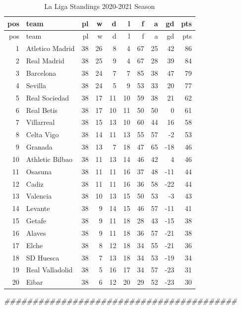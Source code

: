 \documentclass[]{tufte-handout}
\newenvironment{Shaded}{}{}
\newcommand{\DocumentationTok}[1]{\textcolor[rgb]{0.73,0.13,0.13}{\textit{#1}}}
\begin{document}
\begin{longtable}[]{@{}rlrrrrrrrr@{}}
\caption{La Liga Standings 2020-2021 Season}\tabularnewline
\toprule
pos & team & pl & w & d & l & f & a & gd & pts \\
\midrule
\endfirsthead
\toprule
pos & team & pl & w & d & l & f & a & gd & pts \\
\midrule
\endhead
1 & Atletico Madrid & 38 & 26 & 8 & 4 & 67 & 25 & 42 & 86 \\
2 & Real Madrid & 38 & 25 & 9 & 4 & 67 & 28 & 39 & 84 \\
3 & Barcelona & 38 & 24 & 7 & 7 & 85 & 38 & 47 & 79 \\
4 & Sevilla & 38 & 24 & 5 & 9 & 53 & 33 & 20 & 77 \\
5 & Real Sociedad & 38 & 17 & 11 & 10 & 59 & 38 & 21 & 62 \\
6 & Real Betis & 38 & 17 & 10 & 11 & 50 & 50 & 0 & 61 \\
7 & Villarreal & 38 & 15 & 13 & 10 & 60 & 44 & 16 & 58 \\
8 & Celta Vigo & 38 & 14 & 11 & 13 & 55 & 57 & -2 & 53 \\
9 & Granada & 38 & 13 & 7 & 18 & 47 & 65 & -18 & 46 \\
10 & Athletic Bilbao & 38 & 11 & 13 & 14 & 46 & 42 & 4 & 46 \\
11 & Osasuna & 38 & 11 & 11 & 16 & 37 & 48 & -11 & 44 \\
12 & Cadiz & 38 & 11 & 11 & 16 & 36 & 58 & -22 & 44 \\
13 & Valencia & 38 & 10 & 13 & 15 & 50 & 53 & -3 & 43 \\
14 & Levante & 38 & 9 & 14 & 15 & 46 & 57 & -11 & 41 \\
15 & Getafe & 38 & 9 & 11 & 18 & 28 & 43 & -15 & 38 \\
16 & Alaves & 38 & 9 & 11 & 18 & 36 & 57 & -21 & 38 \\
17 & Elche & 38 & 8 & 12 & 18 & 34 & 55 & -21 & 36 \\
18 & SD Huesca & 38 & 7 & 13 & 18 & 34 & 53 & -19 & 34 \\
19 & Real Valladolid & 38 & 5 & 16 & 17 & 34 & 57 & -23 & 31 \\
20 & Eibar & 38 & 6 & 12 & 20 & 29 & 52 & -23 & 30 \\
\bottomrule
\end{longtable}

\begin{Shaded}
\begin{Highlighting}[]
\DocumentationTok{\#\#\#\#\#\#\#\#\#\#\#\#\#\#\#\#\#\#\#\#\#\#\#\#\#\#\#\#\#\#\#\#\#\#\#\#\#\#\#\#\#}
\end{Highlighting}
\end{Shaded}
\end{document}

